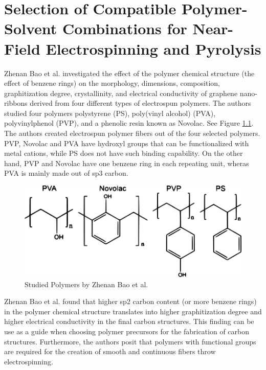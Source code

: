 
\chapter{Selection of Compatible Polymer-Solvent Combinations for Near-Field Electrospinning and Pyrolysis} %

\label{Chapter:3}


Zhenan Bao et al. \cite{Liu2015a} investigated the effect of the polymer chemical structure (the effect of benzene rings) on the morphology, dimensions, composition, graphitization degree, crystallinity, and electrical conductivity of graphene nano-ribbons derived from four different types of electrospun polymers. The authors studied four polymers polystyrene (PS), poly(vinyl alcohol) (PVA), polyvinylphenol (PVP), and a phenolic resin known as Novolac. See Figure \ref{fig:zhenanBaoPolymers}. The authors created  electrospun polymer fibers out of the four selected polymers. PVP, Novolac and PVA have hydroxyl groups that can be functionalized with metal cations, while PS does not have such binding capability. On the other hand, PVP and Novolac have one benzene ring in each repeating unit, wheras PVA is mainly made out of sp3 carbon.

\begin{figure}[!th]
\centering
\includegraphics[scale=0.35]{./Figures/zhenanBaoPolymers.png}
\decoRule
\caption[Studied Polymers by Zhenan Bao et al. \cite{Liu2015a}]{Studied Polymers by Zhenan Bao et al. \cite{Liu2015a}}
\label{fig:zhenanBaoPolymers}
\end{figure}

Zhenan Bao et al. \cite{Liu2015a} found that higher sp2 carbon content (or more benzene rings) in the polymer chemical structure translates into higher graphitization degree and higher electrical conductivity in the final carbon structures. This finding can be use as a guide when choosing polymer precursors for the fabrication of carbon structures. Furthermore, the authors posit that polymers with functional groups are required for the creation of smooth and continuous fibers throw electrospinning. \cite{Liu2015a}

